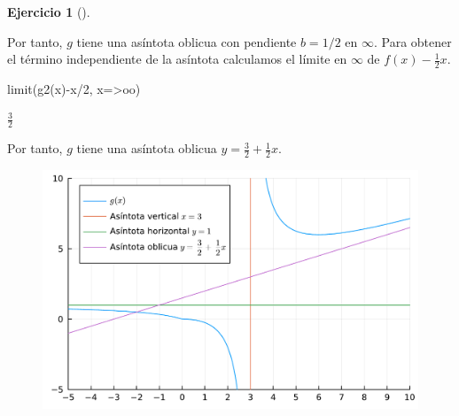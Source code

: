 \documentclass[
  a4paper,
]{scrreport}
\newenvironment{Shaded}{\begin{snugshade}}{\end{snugshade}}
\newcommand{\FloatTok}[1]{\textcolor[rgb]{0.68,0.00,0.00}{#1}}
\newcommand{\FunctionTok}[1]{\textcolor[rgb]{0.28,0.35,0.67}{#1}}
\newcommand{\NormalTok}[1]{\textcolor[rgb]{0.00,0.23,0.31}{#1}}
\newcommand{\OperatorTok}[1]{\textcolor[rgb]{0.37,0.37,0.37}{#1}}
\newcommand{\SpecialCharTok}[1]{\textcolor[rgb]{0.37,0.37,0.37}{#1}}
\newcommand{\StringTok}[1]{\textcolor[rgb]{0.13,0.47,0.30}{#1}}
\theoremstyle{definition}
\newtheorem{exercise}{Ejercicio}[chapter]
\theoremstyle{remark}
\begin{document}
\begin{exercise}[]
\begin{tcolorbox}
Por tanto, \(g\) tiene una asíntota oblicua con pendiente \(b=1/2\) en
\(\infty\). Para obtener el término independiente de la asíntota
calculamos el límite en \(\infty\) de \(f(x)-\frac{1}{2}x\).

\begin{Shaded}
\begin{Highlighting}[]
\FunctionTok{limit}\NormalTok{(}\FunctionTok{g2}\NormalTok{(x)}\OperatorTok{{-}}\NormalTok{x}\OperatorTok{/}\FloatTok{2}\NormalTok{, x}\OperatorTok{=\textgreater{}}\NormalTok{oo)}
\end{Highlighting}
\end{Shaded}

$\frac{3}{2}$

Por tanto, \(g\) tiene una asíntota oblicua
\(y=\frac{3}{2}+\frac{1}{2}x\).

\begin{Shaded}
\end{Shaded}

\begin{figure}[H]

{\centering \includegraphics{./limites_files/figure-pdf/cell-31-output-1.pdf}

}

\end{figure}

\end{tcolorbox}

\end{exercise}
\end{document}
